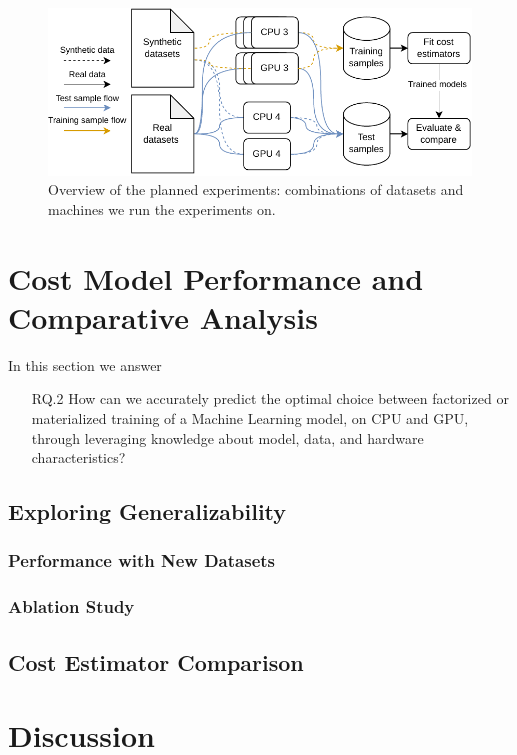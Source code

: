 \begin{figure}[ht]
    \centering
    \includegraphics[width=0.8\linewidth]{chapters/06_evaluation/figures/experiment-pipeline.pdf}
    \caption{ Overview of the planned experiments: combinations of datasets and machines we run the experiments
        on. }
    \label{fig:enter-label}
\end{figure}



\section{Cost Model Performance and Comparative Analysis}
\label{sec:eval-model-evaluation}

In this section we answer
\begin{itemize}
    \item[RQ.2] How can we accurately predict the optimal choice between factorized or materialized training of a Machine Learning model, on CPU and GPU, through leveraging knowledge about model, data, and hardware characteristics?
\end{itemize}

\subsection{Exploring Generalizability}
\subsubsection{Performance with New Datasets}

\subsubsection{Ablation Study}


\subsection{Cost Estimator Comparison}


\section{Discussion}
\label{sec:eval-discussion}

